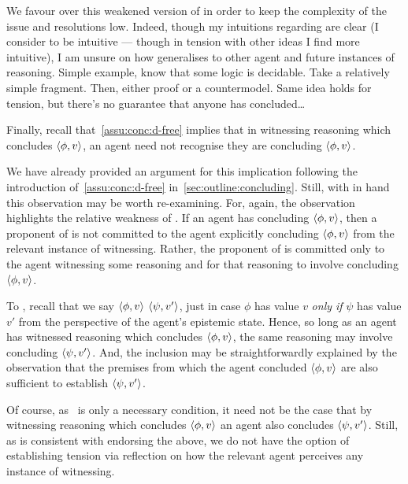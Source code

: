 \begin{note}
{    We favour \ESU{} over this weakened version of \ESU{} in order to keep the complexity of the issue and resolutions low.
    Indeed, though my intuitions regarding \ESU{} are clear (I consider \ESU{} to be intuitive --- though in tension with other ideas I find more intuitive), I am unsure on how \ESU{} generalises to other agent and future instances of reasoning.
    {
      \color{red}
      Simple example, know that some logic is decidable.
      Take a relatively simple fragment.
      Then, either proof or a countermodel.
      Same idea holds for tension, but there's no guarantee that anyone has concluded\dots
    }
  }
\end{note}

\begin{note}
  Finally, recall that~\autoref{assu:conc:d-free} implies that in witnessing reasoning which concludes \(\langle \phi, v \rangle\), an agent need not recognise they are concluding \(\langle \phi, v \rangle\).

  We have already provided an argument for this implication following the introduction of~\autoref{assu:conc:d-free} in~\autoref{sec:outline:concluding}.
  Still, with \ESU{} in hand this observation may be worth re-examining.
  For, again, the observation highlights the relative weakness of \ESU{}.
  If an agent has concluding \(\langle \phi, v \rangle\), then a proponent of \ESU{} is not committed to the agent explicitly concluding \(\langle \phi, v \rangle\) from the relevant instance of witnessing.
  Rather, the proponent of \ESU{} is committed only to the agent witnessing some reasoning and for that reasoning to involve concluding \(\langle \phi, v \rangle\).

  To \illu{}, recall that we say \(\langle \phi, v \rangle\) \indicatePr{} \(\langle \psi, v' \rangle\), just in case \(\phi\) has value \(v\) \emph{only if} \(\psi\) has value \(v'\) from the perspective of the agent's epistemic state.
  Hence, so long as an agent has witnessed reasoning which concludes \(\langle \phi, v \rangle\), the same reasoning may involve concluding \(\langle \psi, v' \rangle\).
  And, the inclusion may be straightforwardly explained by the observation that the premises from which the agent concluded \(\langle \phi, v \rangle\) are also sufficient to establish \(\langle \psi, v' \rangle\).

  Of course, as~\ESU{} is only a necessary condition, it need not be the case that by witnessing reasoning which concludes \(\langle \phi, v \rangle\) an agent also concludes \(\langle \psi, v' \rangle\).
  Still, as \ESU{} is consistent with endorsing the above, we do not have the option of establishing tension via reflection on how the relevant agent perceives any instance of witnessing.
\end{note}

